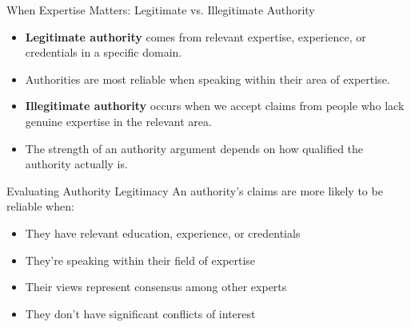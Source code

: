 \documentclass{beamer}
\begin{document}
\begin{frame}{When Expertise Matters: Legitimate vs. Illegitimate Authority}
    \begin{itemize}
        \item \textbf{Legitimate authority} comes from relevant expertise, experience, or credentials in a specific domain.
        \item Authorities are most reliable when speaking within their area of expertise.
        \item \textbf{Illegitimate authority} occurs when we accept claims from people who lack genuine expertise in the relevant area.
        \item The strength of an authority argument depends on how qualified the authority actually is.
    \end{itemize}
    
    \begin{block}{Evaluating Authority Legitimacy}
        An authority's claims are more likely to be reliable when:
        \begin{itemize}
            \item They have relevant education, experience, or credentials
            \item They're speaking within their field of expertise
            \item Their views represent consensus among other experts
            \item They don't have significant conflicts of interest
        \end{itemize}
    \end{block}
\end{frame}
\end{document}
